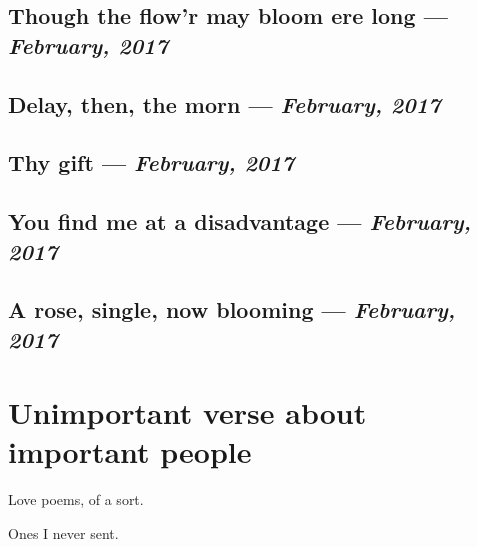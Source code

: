 \documentclass[10pt]{memoir}
\begin{document}
  \section{Though the flow'r may bloom ere long --- \textit{February, 2017}}

  
  \newpage


  \section{Delay, then, the morn --- \textit{February, 2017}}

  
  \newpage


  \section{Thy gift --- \textit{February, 2017}}

  
  \newpage


  \section{You find me at a disadvantage --- \textit{February, 2017}}

  
  \newpage


  \section{A rose, single, now blooming --- \textit{February, 2017}}
  \null
  


  \chapter{Unimportant verse about important people}

  Love poems, of a sort.

  \vfill

  \hfill Ones I never sent.
  \thispagestyle{empty}
  \newpage


  
\end{document}
